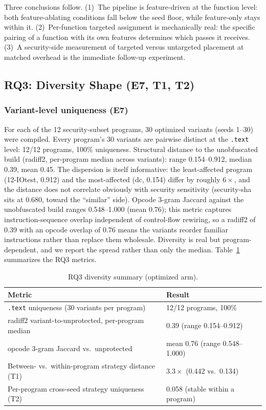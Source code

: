 \documentclass[5p,times,authoryear]{elsarticle}
\theoremstyle{plain}
\theoremstyle{definition}
\theoremstyle{remark}
\begin{document}
Three conclusions follow. (1)~The pipeline is feature-driven at the function
level: both feature-ablating conditions fall below the seed floor, while
feature-only stays within it. (2)~Per-function targeted assignment is
mechanically real: the specific pairing of a function with its own features
determines which passes it receives. (3)~A security-side measurement of
targeted versus untargeted placement at matched overhead is the immediate
follow-up experiment.

\subsection{RQ3: Diversity Shape (E7, T1, T2)}
\label{sec:rq3}

\subsubsection{Variant-level uniqueness (E7)}
For each of the 12 security-subset programs, 30 optimized variants (seeds 1--30) were
compiled. Every program's 30 variants are pairwise distinct at the \texttt{.text}
level: 12/12 programs, 100\% uniqueness. Structural distance to the unobfuscated build
(radiff2, per-program median across variants): range 0.154--0.912, median 0.39, mean
0.45. The dispersion is itself informative: the least-affected program (12-IOtest,
0.912) and the most-affected (dc, 0.154) differ by roughly $6\times$, and the distance
does not correlate obviously with security sensitivity (security-sha sits at 0.680,
toward the ``similar'' side). Opcode 3-gram Jaccard against the unobfuscated build
ranges 0.548--1.000 (mean 0.76); this metric captures instruction-sequence overlap
independent of control-flow rewiring, so a radiff2 of 0.39 with an opcode overlap of
0.76 means the variants reorder familiar instructions rather than replace them
wholesale. Diversity is real but program-dependent, and we
report the spread rather than only the median. Table~\ref{tab:e7_diversity}
summarizes the RQ3 metrics.

\begin{table}[!t]
\centering
\footnotesize
\caption{RQ3 diversity summary (optimized arm).}
\label{tab:e7_diversity}
\begin{tabular}{p{}p{}}
\toprule
Metric & Result \\
\midrule
\texttt{.text} uniqueness (30 variants per program) & 12/12 programs, 100\% \\
radiff2 variant-to-unprotected, per-program median & 0.39 (range 0.154--0.912) \\
opcode 3-gram Jaccard vs.\ unprotected & mean 0.76 (range 0.548--1.000) \\
Between- vs.\ within-program strategy distance (T1) & $3.3\times$ (0.442 vs.\ 0.134) \\
Per-program cross-seed strategy uniqueness (T2) & 0.058 (stable within a program) \\
\bottomrule
\end{tabular}
\end{table}
\end{document}
